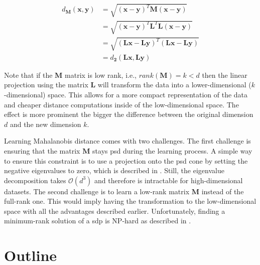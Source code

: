 \documentclass[12pt,a4paper]{report}
\begin{document}
\begin{align}
  d_{\bm{M}}(\textbf{x},\textbf{y}) &= \sqrt{(\textbf{x}-\textbf{y})^{T}\bm{M}(\textbf{x}-\textbf{y})} \nonumber\\
         &= \sqrt{(\textbf{x}-\textbf{y})^{T}\bm{L}^{T}\bm{L}(\textbf{x}-\textbf{y})} \nonumber\\
         &= \sqrt{(\bm{L}\textbf{x}-\bm{L}\textbf{y})^{T}(\bm{L}\textbf{x}-\bm{L}\textbf{y})} \nonumber\\
         &= d_{\bm{2}}(\bm{L}\textbf{x}, \bm{L}\textbf{y}) \label{eq:mahalanobis:transform}
\end{align}

Note that if the $\bm{M}$ matrix is low rank, i.e., $rank(\bm{M})=k<d$ then the linear projection using the matrix $\bm{L}$ will transform the data into a lower-dimensional ($k$-dimensional) space. This allows for a more compact representation of the data and cheaper distance computations inside of the low-dimensional space. The effect is more prominent the bigger the difference between the original dimension $d$ and the new dimension $k$.

Learning Mahalanobis distance comes with two challenges. The first challenge is ensuring that the matrix $\bm{M}$ stays \ac{psd} during the learning process. A simple way to ensure this constraint is to use a projection onto the \ac{psd} cone by setting the negative eigenvalues to zero, which is described in \cite{qian2015efficient}. Still, the eigenvalue decomposition takes $\mathcal{O}(d^3)$ and therefore is intractable for high-dimensional datasets. The second challenge is to learn a low-rank matrix $\bm{M}$ instead of the full-rank one. This would imply having the transformation to the low-dimensional space with all the advantages described earlier. Unfortunately, finding a minimum-rank solution of a \ac{sdp} is NP-hard as described in \cite{lemon2016low}.



\section{Outline}

\end{document}
